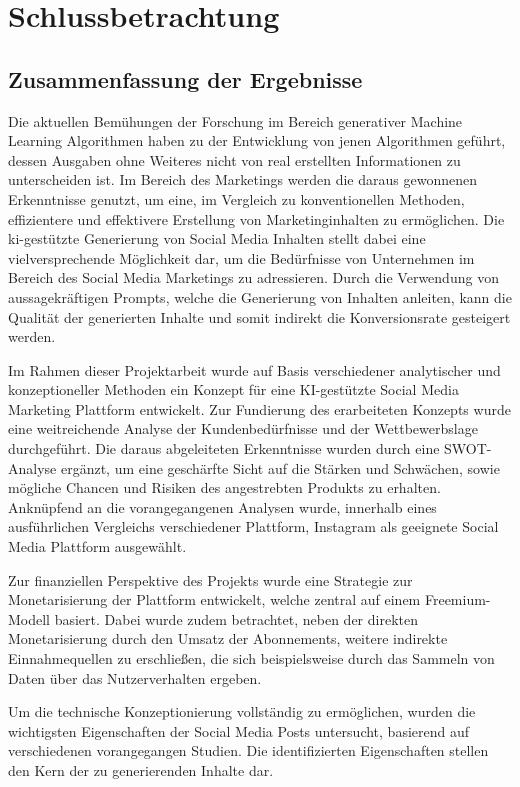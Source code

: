 \newpage
\section{Schlussbetrachtung}

\subsection{Zusammenfassung der Ergebnisse}

Die aktuellen Bemühungen der Forschung im Bereich generativer Machine Learning Algorithmen haben zu der Entwicklung von jenen Algorithmen geführt, dessen Ausgaben ohne Weiteres nicht von real erstellten Informationen zu unterscheiden ist.
Im Bereich des Marketings werden die daraus gewonnenen Erkenntnisse genutzt, um eine, im Vergleich zu konventionellen Methoden, effizientere und effektivere Erstellung von Marketinginhalten zu ermöglichen.
Die ki-gestützte Generierung von Social Media Inhalten stellt dabei eine vielversprechende Möglichkeit dar, um die Bedürfnisse von Unternehmen im Bereich des Social Media Marketings zu adressieren.
Durch die Verwendung von aussagekräftigen Prompts, welche die Generierung von Inhalten anleiten, kann die Qualität der generierten Inhalte und somit indirekt die Konversionsrate gesteigert werden.

Im Rahmen dieser Projektarbeit wurde auf Basis verschiedener analytischer und konzeptioneller Methoden ein Konzept für eine KI-gestützte Social Media Marketing Plattform entwickelt.
Zur Fundierung des erarbeiteten Konzepts wurde eine weitreichende Analyse der Kundenbedürfnisse und der Wettbewerbslage durchgeführt.
Die daraus abgeleiteten Erkenntnisse wurden durch eine SWOT-Analyse ergänzt, um eine geschärfte Sicht auf die Stärken und Schwächen, sowie mögliche Chancen und Risiken des angestrebten Produkts zu erhalten.
Anknüpfend an die vorangegangenen Analysen wurde, innerhalb eines ausführlichen Vergleichs verschiedener Plattform, Instagram als geeignete Social Media Plattform ausgewählt.

Zur finanziellen Perspektive des Projekts wurde eine Strategie zur Monetarisierung der Plattform entwickelt, welche zentral auf einem Freemium-Modell basiert.
Dabei wurde zudem betrachtet, neben der direkten Monetarisierung durch den Umsatz der Abonnements, weitere indirekte Einnahmequellen zu erschließen, die sich beispielsweise durch das Sammeln von Daten über das Nutzerverhalten ergeben.

Um die technische Konzeptionierung vollständig zu ermöglichen, wurden die wichtigsten Eigenschaften der Social Media Posts untersucht, basierend auf verschiedenen vorangegangen Studien.
Die identifizierten Eigenschaften stellen den Kern der zu generierenden Inhalte dar.

